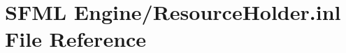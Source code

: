 \hypertarget{_resource_holder_8inl}{}\section{S\+F\+ML Engine/\+Resource\+Holder.inl File Reference}
\label{_resource_holder_8inl}
